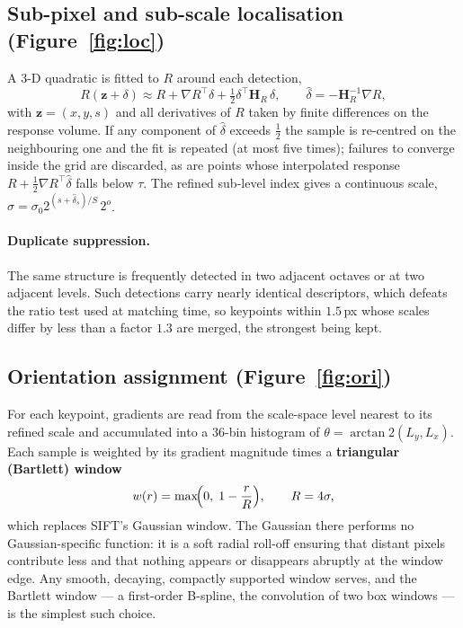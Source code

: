 \documentclass[11pt,a4paper]{article}
\begin{document}
\subsection{Sub-pixel and sub-scale localisation (Figure~\ref{fig:loc})}

A $3$-D quadratic is fitted to $R$ around each detection,
\begin{equation}
R(\mathbf{z}+\delta)\approx R+\nabla R^{\!\top}\delta
+\tfrac12\delta^{\!\top}\mathbf{H}_R\,\delta ,
\qquad
\hat\delta=-\mathbf{H}_R^{-1}\nabla R ,
\end{equation}
with $\mathbf{z}=(x,y,s)$ and all derivatives of $R$ taken by finite
differences on the response volume. If any component of $\hat\delta$ exceeds
$\tfrac12$ the sample is re-centred on the neighbouring one and the fit is
repeated (at most five times); failures to converge inside the grid are
discarded, as are points whose interpolated response
$R+\tfrac12\nabla R^{\!\top}\hat\delta$ falls below $\tau$. The refined
sub-level index gives a continuous scale,
$\sigma=\sigma_0 2^{(s+\hat\delta_s)/S}\,2^{o}$.

\paragraph{Duplicate suppression.} The same structure is frequently detected in
two adjacent octaves or at two adjacent levels. Such detections carry nearly
identical descriptors, which defeats the ratio test used at matching time, so
keypoints within $1.5$\,px whose scales differ by less than a factor $1.3$ are
merged, the strongest being kept.

\subsection{Orientation assignment (Figure~\ref{fig:ori})}

For each keypoint, gradients are read from the scale-space level nearest to its
refined scale and accumulated into a $36$-bin histogram of
$\theta=\arctan2(L_y,L_x)$. Each sample is weighted by its gradient magnitude
times a \textbf{triangular (Bartlett) window}
\begin{equation}
w(r)=\max\!\Bigl(0,\;1-\frac{r}{R}\Bigr),\qquad R=4\sigma ,
\end{equation}
which replaces SIFT's Gaussian window. The Gaussian there performs no
Gaussian-specific function: it is a soft radial roll-off ensuring that distant
pixels contribute less and that nothing appears or disappears abruptly at the
window edge. Any smooth, decaying, compactly supported window serves, and the
Bartlett window --- a first-order B-spline, the convolution of two box windows
--- is the simplest such choice.
\end{document}
